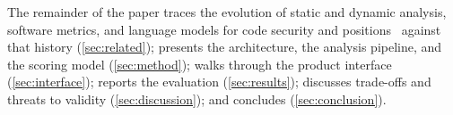 The remainder of the paper traces the evolution of static and dynamic
analysis, software metrics, and language models for code security and
positions \cs\ against that history (\cref{sec:related}); presents the
architecture, the analysis pipeline, and the scoring model
(\cref{sec:method}); walks through the product interface
(\cref{sec:interface}); reports the evaluation (\cref{sec:results});
discusses trade-offs and threats to validity (\cref{sec:discussion}); and
concludes (\cref{sec:conclusion}).
